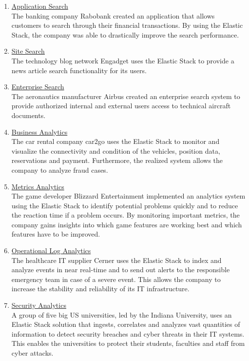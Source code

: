 \begin{enumerate}
    
    \item \underline{Application Search} \autocite{slevat.2018} \\
    The banking company Rabobank created an application that allows customers to search through their financial transactions. By using the Elastic Stack, the company was able to drastically improve the search performance.
    
    \item \underline{Site Search} \autocite{elastic2019_03} \\
    The technology blog network Engadget uses the Elastic Stack to provide a news article search functionality for its users. 

    \item \underline{Enterprise Search} \autocite{elastic2019_04} \\
    The aeronautics manufacturer Airbus created an enterprise search system to provide authorized internal and external users access to technical aircraft documents.  

    \item \underline{Business Analytics} \autocite{elastic2019_05} \\
    The car rental company car2go uses the Elastic Stack to monitor and visualize the connectivity and condition of the vehicles, position data, reservations and payment. Furthermore, the realized system allows the company to analyze fraud cases.

    \item \underline{Metrics Analytics} \autocite{elastic2019_06} \\
    The game developer Blizzard Entertainment implemented an analytics system using the Elastic Stack to identify potential problems quickly and to reduce the reaction time if a problem occurs. By monitoring important metrics, the company gains insights into which game features are working best and which features have to be improved.

    \item \underline{Operational Log Analytics} \autocite{elastic2019_07} \\
    The healthcare IT supplier Cerner uses the Elastic Stack to index and analyze events in near real-time and to send out alerts to the responsible emergency team in case of a severe event. This allows the company to increase the stability and reliability of its IT infrastructure. 
    
    \item \underline{Security Analytics} \autocite{paquettem.2018} \\
    A group of five big US universities, led by the Indiana University, uses an Elastic Stack solution that ingests, correlates and analyzes vast quantities of information to detect security breaches and cyber threats in their IT systems. This enables the universities to protect their students, faculties and staff from cyber attacks.

\end{enumerate}
